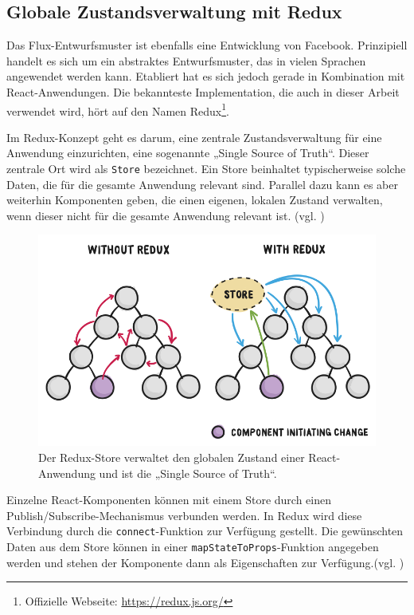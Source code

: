 \subsection{Globale Zustandsverwaltung mit Redux}
\label{chap:redux_state_management}
Das Flux-Entwurfsmuster ist ebenfalls eine Entwicklung von Facebook. Prinzipiell handelt es sich um ein abstraktes Entwurfsmuster, das in vielen Sprachen angewendet werden kann. Etabliert hat es sich jedoch gerade in Kombination mit React-Anwendungen. Die bekannteste Implementation, die auch in dieser Arbeit verwendet wird, hört auf den Namen Redux\footnote{Offizielle Webseite: \url{https://redux.js.org/}}.

Im Redux-Konzept geht es darum, eine zentrale Zustandsverwaltung für eine Anwendung einzurichten, eine sogenannte „Single Source of Truth“. Dieser zentrale Ort wird als \texttt{Store} bezeichnet. Ein Store beinhaltet typischerweise solche Daten, die für die gesamte Anwendung relevant sind. Parallel dazu kann es aber weiterhin Komponenten geben, die einen eigenen, lokalen Zustand verwalten, wenn dieser nicht für die gesamte Anwendung relevant ist. (vgl. \cite{web:redux_motivation})

\begin{figure}[H]
    \includegraphics[width=12cm]{chapter/entwurf/bilder/BA_redux.png}
    \centering
    \caption[Redux Dataflow]{Der Redux-Store verwaltet den globalen Zustand einer React-Anwendung und ist die „Single Source of Truth“.\protect\footnotemark}

    \label{abb:redux_store}
\end{figure}



Einzelne React-Komponenten können mit einem Store durch einen Publish/Subscribe-Mechanismus verbunden werden. In Redux wird diese Verbindung durch die \texttt{connect}-Funktion zur Verfügung gestellt. Die gewünschten Daten aus dem Store können in einer \texttt{mapStateToProps}-Funktion angegeben werden und stehen der Komponente dann als Eigenschaften zur Verfügung.(vgl. \cite[Abschnitt „Implementing Container Components“]{web:redux_react})

